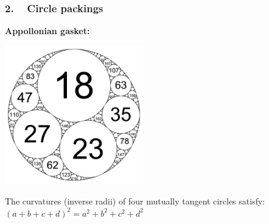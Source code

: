 \begin{frame}
\frametitle{2. ~ Circle packings}



{\bfseries Appollonian gasket:}

\begin{center}
\includegraphics[width=170pt]{ApollonianGasket.png}
\end{center}

The curvatures (inverse radii) of four mutually tangent circles satisfy:
$(a + b + c + d)^2 = a^2 + b^2 + c^2 + d^2 $

\end{frame}
